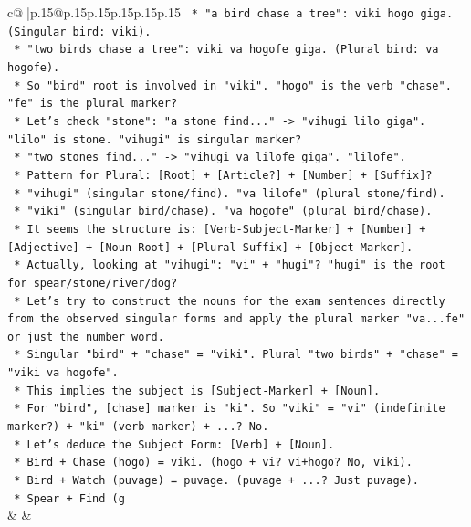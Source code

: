 \documentclass{article}
\begin{document}
{\begin{supertabular}{c@{$\;$}|p{.15\linewidth}@{}p{.15\linewidth}p{.15\linewidth}p{.15\linewidth}p{.15\linewidth}p{.15\linewidth}}
{{{\texttt{            *   "a bird chase a tree": viki hogo giga. (Singular bird: viki).} \\
\texttt{            *   "two birds chase a tree": viki va hogofe giga. (Plural bird: va hogofe).} \\
\texttt{            *   So "bird" root is involved in "viki". "hogo" is the verb "chase". "fe" is the plural marker?} \\
\texttt{            *   Let's check "stone": "a stone find..." {-}> "vihugi lilo giga". "lilo" is stone. "vihugi" is singular marker?} \\
\texttt{            *   "two stones find..." {-}> "vihugi va lilofe giga". "lilofe".} \\
\texttt{            *   Pattern for Plural: {[}Root{]} + {[}Article?{]} + {[}Number{]} + {[}Suffix{]}?} \\
\texttt{            *   "vihugi" (singular stone/find). "va lilofe" (plural stone/find).} \\
\texttt{            *   "viki" (singular bird/chase). "va hogofe" (plural bird/chase).} \\
\texttt{            *   It seems the structure is: {[}Verb{-}Subject{-}Marker{]} + {[}Number{]} + {[}Adjective{]} + {[}Noun{-}Root{]} + {[}Plural{-}Suffix{]} + {[}Object{-}Marker{]}.} \\
\texttt{            *   Actually, looking at "vihugi": "vi" + "hugi"? "hugi" is the root for spear/stone/river/dog?} \\
\texttt{            *   Let's try to construct the nouns for the exam sentences directly from the observed singular forms and apply the plural marker "va...fe" or just the number word.} \\
\texttt{            *   Singular "bird" + "chase" = "viki". Plural "two birds" + "chase" = "viki va hogofe".} \\
\texttt{            *   This implies the subject is {[}Subject{-}Marker{]} + {[}Noun{]}.} \\
\texttt{            *   For "bird", {[}chase{]} marker is "ki". So "viki" = "vi" (indefinite marker?) + "ki" (verb marker) + ...? No.} \\
\texttt{            *   Let's deduce the Subject Form: {[}Verb{]} + {[}Noun{]}.} \\
\texttt{                *   Bird + Chase (hogo) = viki. (hogo + vi? vi+hogo? No, viki).} \\
\texttt{                *   Bird + Watch (puvage) = puvage. (puvage + ...? Just puvage).} \\
\texttt{                *   Spear + Find (g} \\
            }
        }
    }
    & & \\ \\


\end{supertabular}}
\end{document}
